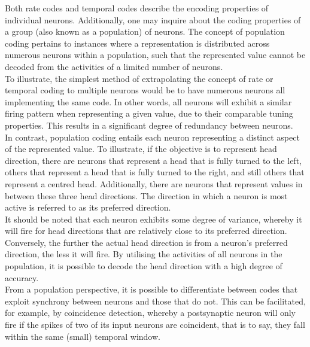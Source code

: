 \noindent Both rate codes and temporal codes describe the encoding properties of individual neurons. Additionally, one may inquire about the coding properties of a group (also known as a population) of neurons. The concept of population coding pertains to instances where a representation is distributed across numerous neurons within a population, such that the represented value cannot be decoded from the activities of a limited number of neurons.\\

\noindent To illustrate, the simplest method of extrapolating the concept of rate or temporal coding to multiple neurons would be to have numerous neurons all implementing the same code. In other words, all neurons will exhibit a similar firing pattern when representing a given value, due to their comparable tuning properties. This results in a significant degree of redundancy between neurons. \\

\noindent In contrast, population coding entails each neuron representing a distinct aspect of the represented value. To illustrate, if the objective is to represent head direction, there are neurons that represent a head that is fully turned to the left, others that represent a head that is fully turned to the right, and still others that represent a centred head. Additionally, there are neurons that represent values in between these three head directions. The direction in which a neuron is most active is referred to as its preferred direction. \\

\noindent It should be noted that each neuron exhibits some degree of variance, whereby it will fire for head directions that are relatively close to its preferred direction. Conversely, the further the actual head direction is from a neuron's preferred direction, the less it will fire. By utilising the activities of all neurons in the population, it is possible to decode the head direction with a high degree of accuracy. \\

\noindent From a population perspective, it is possible to differentiate between codes that exploit synchrony between neurons and those that do not. This can be facilitated, for example, by coincidence detection, whereby a postsynaptic neuron will only fire if the spikes of two of its input neurons are coincident, that is to say, they fall within the same (small) temporal window. \\

